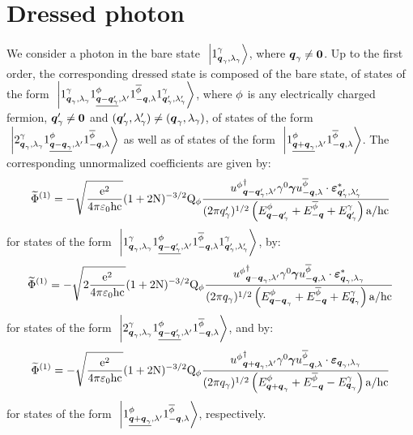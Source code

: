 \documentclass[10pt,a4paper,twoside,openany]{book}
\begin{document}
\section{Dressed photon}

We consider a photon in the bare state $\ \left|{{1}^{\gamma}_{{\boldsymbol{q}_ \gamma}, {\lambda_ \gamma}}}\right\rangle$, where $\boldsymbol{q}_\gamma \neq \boldsymbol{0}$. Up to the first order, the corresponding dressed state is composed of the bare state, of states of the form $\ \left|{{1}^{\gamma}_{{\boldsymbol{q}_ \gamma}, {\lambda_ \gamma}} {1}^{\phi}_{{\underline{\boldsymbol{q}-\boldsymbol{q}_\gamma'}}, {\lambda'}} {1}^{\overline{\phi}}_{{-\boldsymbol{q}}, {\lambda}} {1}^{\gamma}_{{\boldsymbol{q}_\gamma'}, {\lambda_\gamma'}}}\right\rangle$, where $\phi$ is any electrically charged fermion, $\boldsymbol{q}_\gamma' \neq \boldsymbol{0}$ and $(\boldsymbol{q}_\gamma',\lambda_\gamma') \neq (\boldsymbol{q}_ \gamma,\lambda_ \gamma)$, of states of the form $\ \left|{{2}^{\gamma}_{{\boldsymbol{q}_ \gamma}, {\lambda_ \gamma}} {1}^{\phi}_{{\underline{\boldsymbol{q}-\boldsymbol{q}_\gamma}}, {\lambda'}} {1}^{\overline{\phi}}_{{-\boldsymbol{q}}, {\lambda}}}\right\rangle$ as well as of states of the form $\ \left|{{1}^{\phi}_{{\underline{\boldsymbol{q} + \boldsymbol{q}_\gamma}}, {\lambda'}} {1}^{\overline{\phi}}_{{-\boldsymbol{q}}, {\lambda}}}\right\rangle$. The corresponding unnormalized coefficients  are given by:
\begin{equation*}
\widetilde{\Phi}^{(1)} = - \sqrt{\frac{\mathrm e^2}{4 \pi \mathrm \varepsilon_0 \mathrm h \mathrm c}} ( 1 + 2 \mathrm N )^{-3/2} \mathrm Q_{\phi} \frac{{u^{\phi}}^{\dagger}_{{\boldsymbol{q} - \boldsymbol{q}_\gamma'}, {\lambda'}} \gamma^{0} \boldsymbol{\gamma} u^{\overline{\phi}}_{{-\boldsymbol{q}}, {\lambda}} \cdot \boldsymbol{\varepsilon}_{{\boldsymbol{q}_\gamma'},{\lambda_\gamma'}}^*}{( 2 \pi q_\gamma' )^{1 / 2} \left( E^{\phi}_{\boldsymbol{q} - \boldsymbol{q}_\gamma'} + E^{\overline{\phi}}_{-\boldsymbol{q}} + E^{\gamma}_{\boldsymbol{q}_\gamma'} \right) \mathrm a / \mathrm h \mathrm c}
\end{equation*}
for states of the form $\ \left|{{1}^{\gamma}_{{\boldsymbol{q}_ \gamma}, {\lambda_ \gamma}} {1}^{\phi}_{{\underline{\boldsymbol{q}-\boldsymbol{q}_\gamma'}}, {\lambda'}} {1}^{\overline{\phi}}_{{-\boldsymbol{q}}, {\lambda}} {1}^{\gamma}_{{\boldsymbol{q}_\gamma'}, {\lambda_\gamma'}}}\right\rangle$, by:
\begin{equation*}
\widetilde{\Phi}^{(1)} = - \sqrt{2 \frac{\mathrm e^2}{4 \pi \mathrm \varepsilon_0 \mathrm h \mathrm c}} ( 1 + 2 \mathrm N )^{-3/2} \mathrm Q_{\phi} \frac{{u^{\phi}}^{\dagger}_{{\boldsymbol{q} - \boldsymbol{q}_\gamma}, {\lambda'}} \gamma^{0} \boldsymbol{\gamma} u^{\overline{\phi}}_{{-\boldsymbol{q}}, {\lambda}} \cdot \boldsymbol{\varepsilon}_{{\boldsymbol{q}_\gamma},{\lambda_\gamma}}^*}{( 2 \pi q_\gamma )^{1 / 2} \left( E^{\phi}_{\boldsymbol{q} - \boldsymbol{q}_\gamma} + E^{\overline{\phi}}_{-\boldsymbol{q}} + E^{\gamma}_{\boldsymbol{q}_\gamma} \right) \mathrm a / \mathrm h \mathrm c}
\end{equation*}
for states of the form $\ \left|{{2}^{\gamma}_{{\boldsymbol{q}_ \gamma}, {\lambda_ \gamma}} {1}^{\phi}_{{\underline{\boldsymbol{q}-\boldsymbol{q}_\gamma'}}, {\lambda'}} {1}^{\overline{\phi}}_{{-\boldsymbol{q}}, {\lambda}}}\right\rangle$, and by:
\begin{equation*}
\widetilde{\Phi}^{(1)} = - \sqrt{\frac{\mathrm e^2}{4 \pi \mathrm \varepsilon_0 \mathrm h \mathrm c}} ( 1 + 2 \mathrm N )^{-3/2} \mathrm Q_{\phi} \frac{{u^{\phi}}^{\dagger}_{{\boldsymbol{q} + \boldsymbol{q}_\gamma}, {\lambda'}} \gamma^{0} \boldsymbol{\gamma} u^{\overline{\phi}}_{{-\boldsymbol{q}}, {\lambda}} \cdot \boldsymbol{\varepsilon}_{{\boldsymbol{q}_\gamma},{\lambda_\gamma}}}{( 2 \pi q_\gamma )^{1 / 2} \left( E^{\phi}_{\boldsymbol{q} + \boldsymbol{q}_\gamma} + E^{\overline{\phi}}_{-\boldsymbol{q}} - E^{\gamma}_{\boldsymbol{q}_\gamma} \right) \mathrm a / \mathrm h \mathrm c}
\end{equation*}
for states of the form $\ \left|{{1}^{\phi}_{{\underline{\boldsymbol{q} + \boldsymbol{q}_\gamma}}, {\lambda'}} {1}^{\overline{\phi}}_{{-\boldsymbol{q}}, {\lambda}}}\right\rangle$, respectively.
\end{document}
